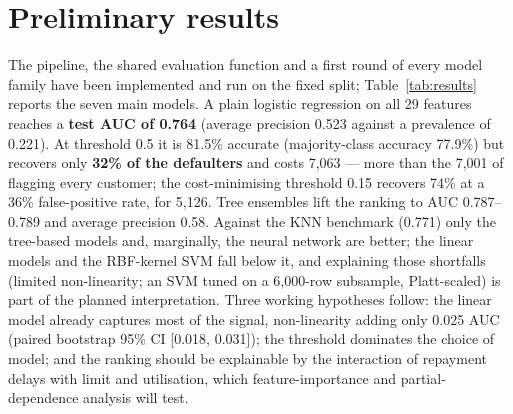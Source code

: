\documentclass{article}
\begin{document}
\section{Preliminary results}
\label{sec:prelim}

The pipeline, the shared evaluation function and a first round of every model
family have been implemented and run on the fixed split; Table~\ref{tab:results}
reports the seven main models. A plain logistic regression on all 29 features
reaches a \textbf{test AUC of 0.764} (average precision 0.523 against a
prevalence of 0.221). At threshold 0.5 it is 81.5\%
accurate (majority-class accuracy 77.9\%) but recovers only \textbf{32\% of the
defaulters} and costs 7{,}063 --- more than the 7{,}001 of flagging every
customer; the cost-minimising threshold 0.15 recovers 74\% at a 36\%
false-positive rate, for 5{,}126. Tree
ensembles lift the ranking to AUC 0.787--0.789 and average precision 0.58. Against
the KNN benchmark (0.771) only the tree-based models and, marginally, the neural
network are better; the linear models and the RBF-kernel SVM fall below it, and
explaining those shortfalls (limited non-linearity; an SVM tuned on a 6,000-row
subsample, Platt-scaled) is part of the planned interpretation.
Three working hypotheses follow: the linear model already captures most of the
signal, non-linearity adding only 0.025 AUC (paired bootstrap 95\% CI
[0.018, 0.031]); the threshold dominates the choice of model; and the ranking
should be explainable by the interaction of
repayment delays with limit and utilisation, which feature-importance and
partial-dependence analysis will test.
\end{document}

